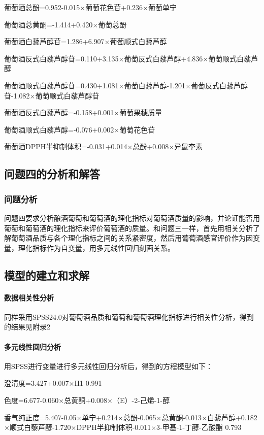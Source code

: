 \documentclass[UTF8,12.05pt]{ctexart}
\begin{document}
葡萄酒总酚=0.952-0.015$\times$葡萄花色苷+0.236$\times$葡萄单宁

葡萄酒总黄酮=-1.414+0.420$\times$葡萄总酚

葡萄酒白藜芦醇苷=1.286+6.907$\times$葡萄顺式白藜芦醇

葡萄酒反式白藜芦醇苷=0.110+3.135$\times$葡萄反式白藜芦醇+4.836$\times$葡萄顺式白藜芦醇

葡萄酒顺式白藜芦醇苷=0.430+1.081$\times$葡萄白藜芦醇-1.201$\times$葡萄反式白藜芦醇苷-1.082$\times$葡萄顺式白藜芦醇苷

葡萄酒反式白藜芦醇=-0.158+0.001$\times$葡萄果穗质量

葡萄酒顺式白藜芦醇=-0.076+0.002$\times$葡萄花色苷

葡萄酒DPPH半抑制体积=-0.031+0.014$\times$总酚+0.008$\times$异鼠李素
\subsection{\heiti{}问题四的分析和解答}
\subsubsection{\heiti{}问题分析}
问题四要求分析酿酒葡萄和葡萄酒的理化指标对葡萄酒质量的影响，并论证能否用葡萄和葡萄酒的理化指标来评价葡萄酒的质量。和问题三一样，首先用相关分析了解葡萄酒品质与各个理化指标之间的关系紧密度，然后用葡萄酒感官评价作为因变量，理化指标作为自变量，用多元线性回归刻画关系\cite{qiantanputaojiuniangjiu}。
\subsection{\heiti{}模型的建立和求解}
\paragraph{数据相关性分析}
同样采用SPSS24.0对葡萄酒品质和葡萄和葡萄酒理化指标进行相关性分析，得到的结果见附录2
\paragraph{多元线性回归分析}
用SPSS进行变量进行多元线性回归分析后，得到的方程模型如下：

澄清度=3.427+0.007$\times$H1        0.991

色度=6.677-0.060$\times$总黄酮+0.008$\times$（E）-2-己烯-1-醇

香气纯正度=5.407-0.05$\times$单宁+0.214$\times$总酚-0.065$\times$总黄酮-0.013$\times$白藜芦醇+0.182$\times$顺式白藜芦醇-1.720$\times$DPPH半抑制体积-0.011$\times$3-甲基-1-丁醇-乙酸酯            0.793
\end{document}
